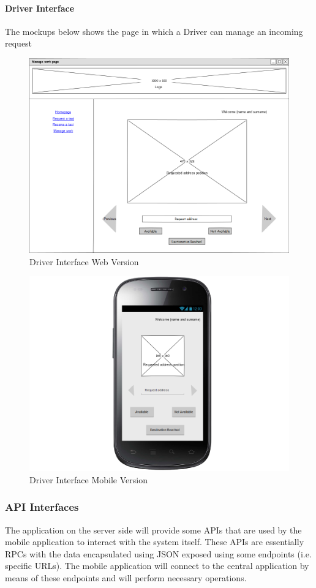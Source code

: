 \documentclass[a4paper,12pt,dvipsnames]{article}%
\begin{document}
\paragraph{Driver Interface}
The mockups below shows the page in which a Driver can manage an incoming request
\begin{figure}[H]
\centering
\includegraphics[scale=0.35]{mockups/manage_work_web.png}
\caption{Driver Interface Web Version}
\end{figure}
\begin{figure}[H]
\centering
\includegraphics[scale=0.35]{mockups/manage_work_mobile.png}
\caption{Driver Interface Mobile Version}
\end{figure}
\break
\subsubsection{API Interfaces}
The application on the server side will provide some APIs that are used by the mobile application to interact with the system itself. These APIs are essentially RPCs with the data encapsulated using JSON exposed using some endpoints (i.e. specific URLs). The mobile application will connect to the central application by means of these endpoints and will perform necessary operations.
\end{document}

